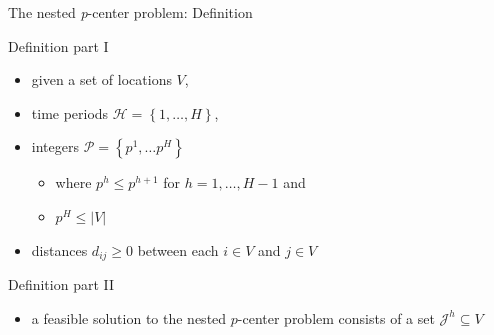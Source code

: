 \documentclass[utf8,aspectratio=169,ngerman,english]{beamer}
\begin{document}
\begin{frame}{The nested \textit{p}-center problem: Definition}
    \begin{minipage}{0.48\textwidth}
        \begin{block}{Definition part I}
            \vspace*{2pt}
            \begin{itemize}
                \item given a set of locations $V$, \pause
                \item time periods $\mathcal H = \left \{1,\dots,H \right \}$, \pause
                \item integers $\mathcal P = \left \{p^1, \dots p^H \right \}$   \pause
                      \begin{itemize}
                          \item where $p^h \leq p^{h+1}$ for $h = 1, \dots, H-1$ and
                          \item $p^H \leq \left\lvert V \right\rvert$
                      \end{itemize} \pause
                \item distances $d_{ij} \geq 0$ between each $i \in V$ and $j \in V$ \pause
            \end{itemize}
            \vspace*{2pt}
        \end{block}
    \end{minipage}
    \begin{minipage}{0.48\textwidth}
        \begin{block}{Definition part II}
            \begin{itemize}
                \item a feasible solution to the nested $p$-center problem consists of a set $\mathcal J^h \subseteq V$ \pause

\end{itemize}
\end{block}
\end{minipage}
\end{frame}
\end{document}
